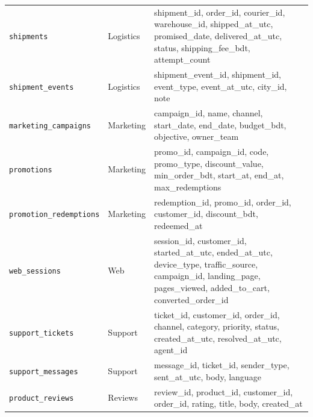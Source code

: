 \documentclass[11pt,a4paper]{article}
\newcommand{\code}[1]{\texttt{\small #1}}
\begin{document}
{\begin{longtable}{@{}l l >{\raggedright\arraybackslash}p{9.3cm}@{}}
\code{shipments} & Logistics & \footnotesize\ttfamily shipment\_id, order\_id, courier\_id, warehouse\_id, shipped\_at\_utc, promised\_date, delivered\_at\_utc, status, shipping\_fee\_bdt, attempt\_count\\
\code{shipment\_events} & Logistics & \footnotesize\ttfamily shipment\_event\_id, shipment\_id, event\_type, event\_at\_utc, city\_id, \textcolor{warn}{note}\\
\code{marketing\_campaigns} & Marketing & \footnotesize\ttfamily campaign\_id, name, channel, start\_date, end\_date, budget\_bdt, objective, owner\_team\\
\code{promotions} & Marketing & \footnotesize\ttfamily promo\_id, campaign\_id, code, promo\_type, discount\_value, min\_order\_bdt, start\_at, end\_at, max\_redemptions\\
\code{promotion\_redemptions} & Marketing & \footnotesize\ttfamily redemption\_id, promo\_id, order\_id, customer\_id, discount\_bdt, redeemed\_at\\
\code{web\_sessions} & Web & \footnotesize\ttfamily session\_id, customer\_id, started\_at\_utc, ended\_at\_utc, device\_type, traffic\_source, campaign\_id, landing\_page, pages\_viewed, added\_to\_cart, converted\_order\_id\\
\code{support\_tickets} & Support & \footnotesize\ttfamily ticket\_id, customer\_id, order\_id, channel, category, priority, status, created\_at\_utc, resolved\_at\_utc, agent\_id\\
\code{support\_messages} & Support & \footnotesize\ttfamily message\_id, ticket\_id, sender\_type, sent\_at\_utc, \textcolor{warn}{body}, language\\
\code{product\_reviews} & Reviews & \footnotesize\ttfamily review\_id, product\_id, customer\_id, order\_id, rating, \textcolor{warn}{title}, \textcolor{warn}{body}, created\_at\\
\bottomrule
\end{longtable}
}
\end{document}
